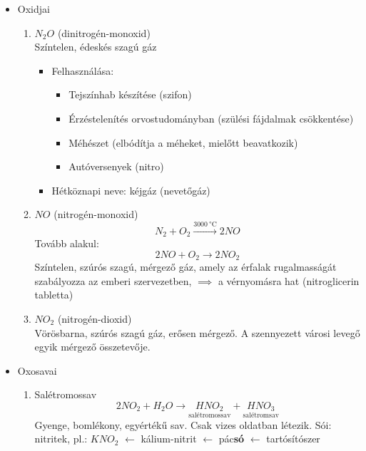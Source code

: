 \documentclass{article}
\begin{document}
\begin{itemize}
    \item Oxidjai
    \begin{enumerate}
        \item $N_2O$ (dinitrogén-monoxid)\\
        Színtelen, édeskés szagú gáz \begin{itemize}
            \item Felhasználása: \begin{itemize}
                \item Tejszínhab készítése (szifon)
                \item Érzéstelenítés orvostudományban (szülési fájdalmak csökkentése)
                \item Méhészet (elbódítja a méheket, mielőtt beavatkozik)
                \item Autóversenyek (nitro)
            \end{itemize}
            \item Hétköznapi neve: kéjgáz (nevetőgáz)
        \end{itemize}

        \item $NO$ (nitrogén-monoxid)
        \[
        N_2 + O_2 \xrightarrow{\SI{3000}{\degreeCelsius}} 2NO
        \]
        Tovább alakul:
        \[
        2NO + O_2 \rightarrow 2NO_2
        \]
        Színtelen, szúrós szagú, mérgező gáz, amely az érfalak rugalmasságát szabályozza az emberi szervezetben, $\implies$ a vérnyomásra hat (nitroglicerin tabletta)

        \item $NO_2$ (nitrogén-dioxid)\\
        Vörösbarna, szúrós szagú gáz, erősen mérgező. A szennyezett városi levegő egyik mérgező összetevője.
        
    \end{enumerate}

    \item Oxosavai
    \begin{enumerate}
        \item Salétromossav
        \[
        2NO_2 + H_2O \rightarrow \underset{\text{salétromossav}}{HNO_2} + \underset{\text{salétromsav}}{HNO_3}
        \]
        Gyenge, bomlékony, egyértékű sav. Csak vizes oldatban létezik. Sói: nitritek, pl.: $KNO_2$ $\leftarrow$ kálium-nitrit $\leftarrow$ pác\textbf{só} $\leftarrow$ tartósítószer
    \end{enumerate}
\end{itemize}
\end{document}
